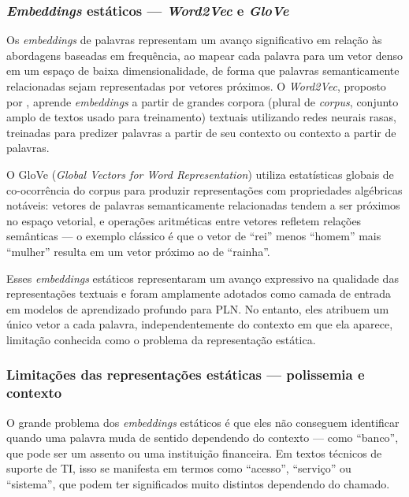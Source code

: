 \documentclass[
    12pt,                %
    openright,           %
    oneside,             %
    a4paper,             %
    english,             %
    brazil               %
]{abntex2}
\begin{document}
\subsubsection{\textit{Embeddings} estáticos — \textit{Word2Vec} e \textit{GloVe}}
\label{subsubsec:pln_embeddings}

Os \textit{embeddings} de palavras representam um avanço significativo em relação às abordagens baseadas em frequência, ao mapear cada palavra para um vetor denso em um espaço de baixa dimensionalidade, de forma que palavras semanticamente relacionadas sejam representadas por vetores próximos. O \textit{Word2Vec}, proposto por , aprende \textit{embeddings} a partir de grandes corpora (plural de \textit{corpus}, conjunto amplo de textos usado para treinamento) textuais utilizando redes neurais rasas, treinadas para predizer palavras a partir de seu contexto ou contexto a partir de palavras. 

O GloVe (\textit{Global Vectors for Word Representation}) utiliza 
estatísticas globais de co-ocorrência do corpus para produzir 
representações com propriedades algébricas notáveis: vetores de 
palavras semanticamente relacionadas tendem a ser próximos no espaço 
vetorial, e operações aritméticas entre vetores refletem relações 
semânticas — o exemplo clássico é que o vetor de ``rei'' menos 
``homem'' mais ``mulher'' resulta em um vetor próximo ao de ``rainha''.

Esses \textit{embeddings} estáticos representaram um avanço expressivo na qualidade das representações textuais e foram amplamente adotados como camada de entrada em modelos de aprendizado profundo para PLN. No entanto, eles atribuem um único vetor a cada palavra, independentemente do contexto em que ela aparece, limitação conhecida como o problema da representação estática.

\subsubsection{Limitações das representações estáticas — polissemia e contexto}
\label{subsubsec:pln_limitacoes}

O grande problema dos \textit{embeddings} estáticos é que eles não 
conseguem identificar quando uma palavra muda de sentido dependendo 
do contexto — como ``banco'', que pode ser um assento ou uma 
instituição financeira. Em textos técnicos de suporte de TI, isso se 
manifesta em termos como ``acesso'', ``serviço'' ou ``sistema'', que 
podem ter significados muito distintos dependendo do chamado.
\end{document}
